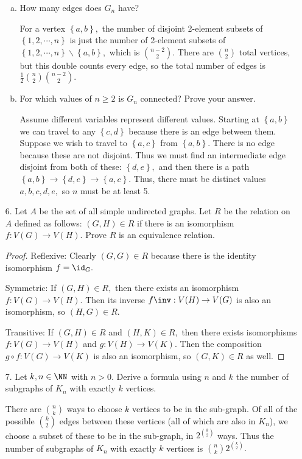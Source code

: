 \documentclass{article}
\begin{document}
\begin{itemize}
\begin{enumerate}[(a)]
			\item How many edges does $G_n$ have?
				\begin{soln}
					For a vertex $\left\{ a, b \right\},$ the number of disjoint 2-element subsets of $\left\{ 1, 2, \cdots, n \right\}$ is just the number of 2-element subsets of $\left\{ 1, 2, \cdots, n \right\}\smallsetminus \left\{ a, b \right\},$ which is $\binom{n-2}{2}.$ There are $\binom{n}{2}$ total vertices, but this double counts every edge, so the total number of edges is $\frac{1}{2} \binom{n}{2} \binom{n-2}{2}.$
				\end{soln}

			\item For which values of $n\ge 2$ is $G_n$ connected? Prove your answer.
				\begin{soln}
					Assume different variables represent different values. Starting at $\left\{ a, b \right\}$ we can travel to any $\left\{ c, d \right\}$ because there is an edge between them. Suppose we wish to travel to $\left\{ a, c \right\}$ from $\left\{ a, b \right\}.$ There is no edge because these are not disjoint. Thus we must find an intermediate edge disjoint from both of these: $\left\{ d, e \right\},$ and then there is a path $\left\{ a, b \right\}\to \left\{ d, e \right\}\to \left\{ a, c \right\}.$ Thus, there must be distinct values $a, b, c, d, e,$ so $n$ must be at least 5.
				\end{soln}

		\end{enumerate}

	\item[6.] Let $A$ be the set of all simple undirected graphs. Let $R$ be the relation on $A$ defined as follows: $(G, H)\in R$ if there is an isomorphism $f:V(G)\to V(H).$ Prove $R$ is an equivalence relation.
		\begin{proof}
			Reflexive: Clearly $(G, G)\in R$ because there is the identity isomorphism $f=\id_G.$

			Symmetric: If $(G, H)\in R,$ then there exists an isomorphism $f:V(G)\to V(H).$ Then its inverse $f\inv: V(H)\to V(G)$ is also an isomorphism, so $(H, G)\in R.$

			Transitive: If $(G, H)\in R$ and $(H, K)\in R,$ then there exists isomorphisms $f:V(G)\to V(H)$ and $g:V(H)\to V(K).$ Then the composition $g\circ f: V(G)\to V(K)$ is also an isomorphism, so $(G, K)\in R$ as well.
		\end{proof}

	\item[7.] Let $k, n\in\NN$ with $n>0.$ Derive a formula using $n$ and $k$ the number of subgraphs of $K_n$ with exactly $k$ vertices.
		\begin{soln}
			There are $\binom{n}{k}$ ways to choose $k$ vertices to be in the sub-graph. Of all of the possible $\binom{k}{2}$ edges between these vertices (all of which are also in $K_n$), we choose a subset of these to be in the sub-graph, in $2^{\binom{k}{2}}$ ways. Thus the number of subgraphs of $K_n$ with exactly $k$ vertices is $\binom{n}{k} 2^{\binom{k}{2}}.$
		\end{soln}


\end{itemize}
\end{document}
